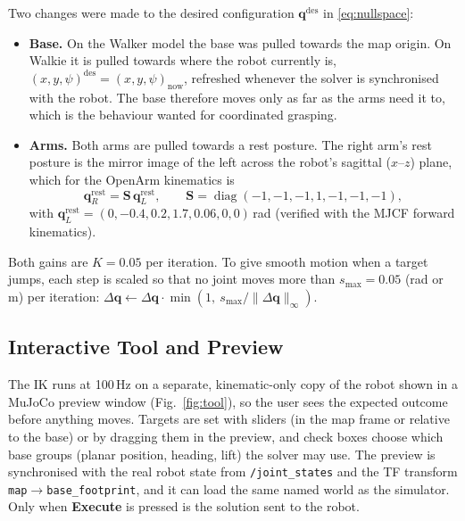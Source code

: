\documentclass[12pt,a4paper]{article}
\begin{document}
Two changes were made to the desired configuration $\mathbf{q}^{\mathrm{des}}$ in \eqref{eq:nullspace}:
\begin{itemize}
    \item \textbf{Base.} On the Walker model the base was pulled towards the map origin. On Walkie it is
          pulled towards where the robot currently is, $(x,y,\psi)^{\mathrm{des}}=(x,y,\psi)_{\mathrm{now}}$,
          refreshed whenever the solver is synchronised with the robot. The base therefore moves only as
          far as the arms need it to, which is the behaviour wanted for coordinated grasping.
    \item \textbf{Arms.} Both arms are pulled towards a rest posture. The right arm's rest posture is the
          mirror image of the left across the robot's sagittal ($x$--$z$) plane, which for the OpenArm
          kinematics is
          \begin{equation}
              \mathbf{q}_R^{\mathrm{rest}}=\mathbf{S}\,\mathbf{q}_L^{\mathrm{rest}},\qquad
              \mathbf{S}=\operatorname{diag}(-1,-1,-1,1,-1,-1,-1),
          \end{equation}
          with $\mathbf{q}_L^{\mathrm{rest}}=(0,-0.4,0.2,1.7,0.06,0,0)$\,rad (verified with the MJCF forward
          kinematics).
\end{itemize}
Both gains are $K=0.05$ per iteration. To give smooth motion when a target jumps, each step is scaled
so that no joint moves more than $s_{\max}=0.05$ (rad or m) per iteration:
$\Delta\mathbf{q}\leftarrow\Delta\mathbf{q}\cdot\min\!\left(1,\ s_{\max}/\|\Delta\mathbf{q}\|_\infty\right)$.

\subsection{Interactive Tool and Preview}

The IK runs at 100\,Hz on a separate, kinematic-only copy of the robot shown in a MuJoCo preview
window (Fig.~\ref{fig:tool}), so the user sees the expected outcome before anything moves. Targets are
set with sliders (in the map frame or relative to the base) or by dragging them in the preview, and
check boxes choose which base groups (planar position, heading, lift) the solver may use. The preview
is synchronised with the real robot state from \texttt{/joint\_states} and the TF transform
\texttt{map}$\to$\texttt{base\_footprint}, and it can load the same named world as the simulator.
Only when \textbf{Execute} is pressed is the solution sent to the robot.
\end{document}
